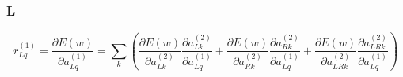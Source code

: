 \documentclass[11pt]{article}
\begin{document}
\subsubsection*{L} 
$$r^{(1)}_{Lq} = \frac{\partial E(w)}{\partial a^{(1)}_{Lq}} =\sum_{k} ( \frac{\partial E(w)}{\partial a^{(2)}_{Lk}} \frac{\partial a^{(2)}_{Lk}}{\partial a^{(1)}_{Lq}} + \frac{\partial E(w)}{\partial a^{(2)}_{Rk}} \frac{\partial a^{(2)}_{Rk}}{\partial a^{(1)}_{Lq}} +  \frac{\partial E(w)}{\partial a^{(2)}_{LRk}} \frac{\partial a^{(2)}_{LRk}}{\partial a^{(1)}_{Lq}} )$$
\end{document}
